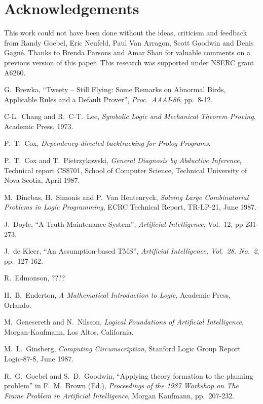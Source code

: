 \section*{Acknowledgements}
This work could not have been done without the ideas,
criticism and feedback from Randy Goebel, Eric Neufeld,
Paul Van Arragon, Scott Goodwin and Denis Gagn\'e.
Thanks to Brenda Parsons and Amar Shan for valuable comments on
a previous version of this paper.
This research was supported under NSERC grant A6260.
\begin{thebibliography}{McDer80}
G.\ Brewka,
``Tweety -- Still Flying: Some Remarks on Abnormal Birds, Applicable Rules
and a Default Prover'',
{\em Proc.\ AAAI-86}, pp.\ 8-12.

C-L.\ Chang and R.\ C-T.\ Lee,
{\em Symbolic Logic and Mechanical Theorem Proving},
Academic Press, 1973.

P.\ T.\ Cox, {\em Dependency-directed backtracking for Prolog Programs}.

P.\ T.\ Cox and T.\ Pietrzykowski, {\em General Diagnosis by Abductive
Inference}, Technical report CS8701, School of Computer Science,
Technical University of Nova Scotia, April 1987.

M.~Dincbas, H.~Simonis and P.~Van Hentenryck,
{\em Solving Large Combinatorial Problems in Logic Programming\/},
ECRC Technical Report, TR-LP-21, June 1987.

J.\ Doyle,
``A Truth Maintenance System'',
{\em Artificial Intelligence},
Vol.\ 12, pp 231-273.

J.\ de Kleer,
``An Assumption-based TMS'',
{\em Artificial Intelligence, Vol.\ 28, No.\ 2}, pp.\ 127-162.

R.~Edmonson, ????

H.\ B.\ Enderton, {\em A Mathematical Introduction to Logic},
Academic Press, Orlando.

M.\ Genesereth and N.\ Nilsson,
{\em Logical Foundations of Artificial Intelligence},
Morgan-Kaufmann, Los Altos, California.

M.~L.~Ginsberg, {\em Computing Circumscription\/},
Stanford Logic Group Report Logic-87-8, June 1987.

R.\ G.\ Goebel and S.\ D.\ Goodwin,
``Applying theory formation to the planning problem''
in F.\ M.\ Brown (Ed.),
{\em Proceedings of the 1987 Workshop on The Frame Problem in Artificial
Intelligence}, Morgan Kaufmann, pp.\ 207-232.


\end{thebibliography}
